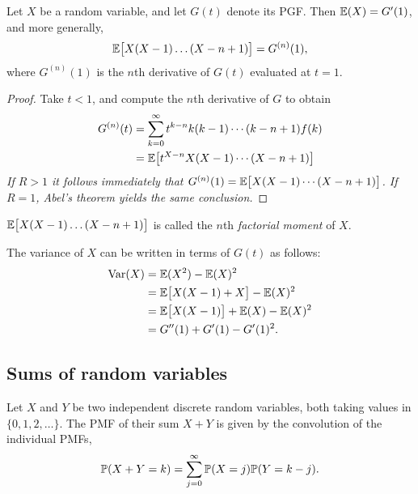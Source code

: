 \begin{theorem}
Let $X$ be a random variable, and let $G(t)$ denote its PGF. Then $\mathbb{E}(X) = G'(1)$, and more generally,
\[
\mathbb{E}\big[X(X-1)\ldots(X-n+1)\big] = G^{(n)}(1),
\]
where $G^{(n)}(1)$ is the $n$th derivative of $G(t)$ evaluated at $t=1$.
\end{theorem}

\begin{proof}
Take $t < 1$, and compute the $n$th derivative of $G$ to obtain
\begin{align*}
G^{(n)}(t) 
	& = \sum_{k=0}^{\infty} t^{k-n} k(k-1)\cdots(k-n+1) f(k) \\
	& = \mathbb{E}\big[t^{X-n} X(X-1)\cdots(X-n+1)\big]
\end{align*}
\bit
\it If $R>1$ it follows immediately that $G^{(n)}(1) = \mathbb{E}\big[X(X-1)\cdots(X-n+1)\big]$.
\it If $R=1$, Abel's theorem yields the same conclusion.
\eit
\end{proof}

\begin{remark}
$\mathbb{E}\big[X(X-1)\ldots(X-n+1)\big]$ is called the $n$th \emph{factorial moment} of $X$.
\end{remark}

\begin{example}
The variance of $X$ can be written in terms of $G(t)$ as follows:
\begin{align*}
\text{Var}(X)
	& = \mathbb{E}(X^2) - \mathbb{E}(X)^2 \\
	& = \mathbb{E}\big[X(X-1) + X\big] - \mathbb{E}(X)^2 \\
	& = \mathbb{E}\big[X(X-1)\big] + \mathbb{E}(X) - \mathbb{E}(X)^2 \\
	& = G''(1) + G'(1) - G'(1)^2.
\end{align*}
\end{example}


\subsection{Sums of random variables} 


Let $X$ and $Y$ be two independent discrete random variables, both taking values in $\{0,1,2,\ldots\}$. The PMF of their sum $X+Y$ is given by the convolution of the individual PMFs,
\[
\mathbb{P}(X+Y=k) = \sum_{j=0}^{\infty}\mathbb{P}(X=j)\mathbb{P}(Y=k-j).
\]

